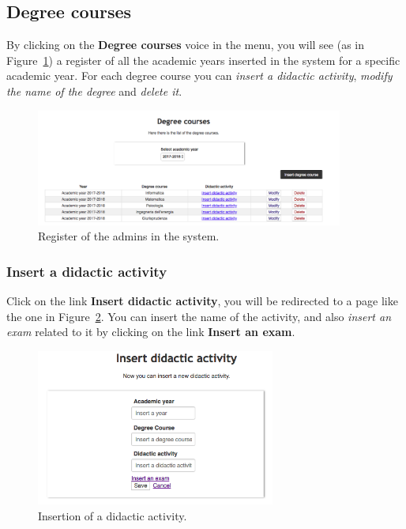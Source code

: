 \subsection{Degree courses}
By clicking on the \textbf{Degree courses} voice in the menu, you will see (as in Figure~\ref{fig:degreeCourses}) a register of all the academic years inserted in the system for a specific academic year. For each degree course you can \emph{insert a didactic activity}, \emph{modify the name of the degree} and \emph{delete it}. 
\begin{figure}[!h]
  \centering
  \includegraphics[width=0.90\textwidth]{img/degreeCourses.png}
  \caption{Register of the admins in the system.}
  \label{fig:degreeCourses}
\end{figure}

\subsubsection{Insert a didactic activity}
Click on the link \textbf{Insert didactic activity}, you will be redirected to a page like the one in Figure~\ref{fig:insertDidacticActivity}. You can insert the name of the activity, and also \emph{insert an exam} related to it by clicking on the link \textbf{Insert an exam}.
\begin{figure}[!h]
  \centering
  \includegraphics[width=0.70\textwidth]{img/insertDidacticActivity.png}
  \caption{Insertion of a didactic activity.}
  \label{fig:insertDidacticActivity}
\end{figure}

